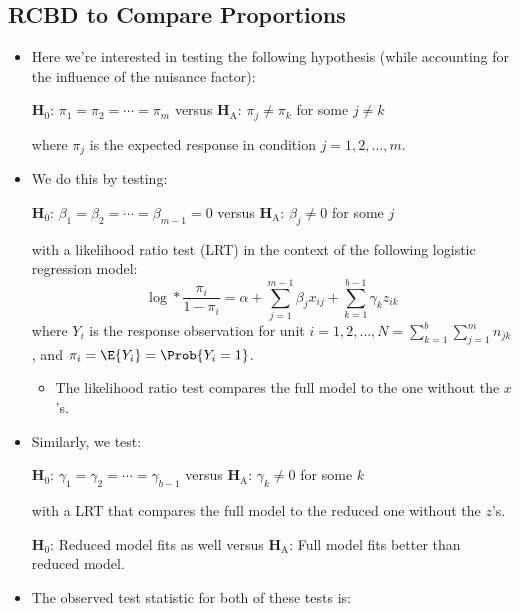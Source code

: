 \subsection{RCBD to Compare Proportions}
\begin{itemize}
    \item Here we're interested in testing the following hypothesis (while accounting for the influence of the
          nuisance factor):
          \begin{tightcenter}
              $ \mathbf{H}_0 $: $ \pi_1=\pi_2=\cdots=\pi_m $ versus $ \mathbf{H}_\text{A} $: $ \pi_j\ne \pi_k $ for some $ j\ne k $
          \end{tightcenter}
          where $ \pi_j $ is the expected response in condition $ j=1,2,\ldots,m $.
    \item We do this by testing:
          \begin{tightcenter}
              $ \mathbf{H}_0 $: $ \beta_1=\beta_2=\cdots=\beta_{m-1}=0 $ versus $ \mathbf{H}_\text{A} $: $ \beta_j\ne 0 $ for some $ j$
          \end{tightcenter}
          with a likelihood ratio test (LRT) in the context of the following logistic regression model:
          \[ \log*{\frac{\pi_i}{1-\pi_i}}=\alpha+\sum_{j=1}^{m-1} \beta_j x_{ij}+\sum_{k=1}^{b-1} \gamma_k z_{ik} \]
          where $ Y_i $ is the response observation for unit $ i=1,2,\ldots,N=\sum_{k=1}^{b} \sum_{j=1}^{m} n_{jk} $,
          and $ \pi_i=\E{Y_i}=\Prob{Y_i=1} $.
          \begin{itemize}
              \item The likelihood ratio test compares the full model to the one without the $ x $'s.
          \end{itemize}
    \item Similarly, we test:
          \begin{tightcenter}
              $ \mathbf{H}_0 $: $ \gamma_1=\gamma_2=\cdots=\gamma_{b-1} $ versus $ \mathbf{H}_\text{A} $: $ \gamma_k\ne 0 $ for some $ k $
          \end{tightcenter}
          with a LRT that compares the full model to the reduced one without the $ z $'s.
          \begin{tightcenter}
              $ \mathbf{H}_0 $: Reduced model fits as well versus $ \mathbf{H}_\text{A} $: Full model fits better than reduced model.
          \end{tightcenter}
    \item The observed test statistic for both of these tests is:

\end{itemize}
